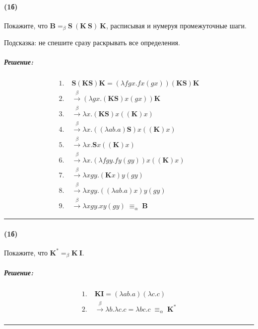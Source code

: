 \documentclass{article}
\newenvironment{proof}{\subparagraph{\hspace{-1em}Решение:\newline}}{\par\noindent\rule{\textwidth}{0.4pt}}
\newcommand{\comb}[1]{\mathbf{#1}}
\newcommand{\eqbeta}{=_\beta}
\begin{document}
    \paragraph{(1б)}

    Покажите, что $\comb{B} \eqbeta \comb{S}~(\comb{K}~\comb{S})~\comb{K}$, расписывая и нумеруя промежуточные шаги.

    Подсказка: не спешите сразу раскрывать все определения.

    \begin{proof}
        \[
            \begin{aligned}
                \text{1.} \;& \mathbf{S} (\mathbf{K}\mathbf{S}) \mathbf{K}
                = (\lambda f g x. f x (g x)) (\mathbf{K}\mathbf{S}) \mathbf{K} \\[1mm]
                \text{2.} \;& \xrightarrow{\beta} (\lambda g x. (\mathbf{K}\mathbf{S}) x (g x)) \mathbf{K} \\[1mm]
                \text{3.} \;& \xrightarrow{\beta} \lambda x. (\mathbf{K}\mathbf{S}) x ((\mathbf{K}) x) \\[1mm]
                \text{4.} \;& \xrightarrow{\beta} \lambda x. ((\lambda a b. a) \mathbf{S}) x ((\mathbf{K}) x) \\[1mm]
                \text{5.} \;& \xrightarrow{\beta} \lambda x. \mathbf{S} x ((\mathbf{K}) x) \\[1mm]
                \text{6.} \;& \xrightarrow{\beta} \lambda x. (\lambda f g y. f y (g y)) x ((\mathbf{K}) x) \\[1mm]
                \text{7.} \;& \xrightarrow{\beta} \lambda x g y. (\mathbf{K} x) y (g y) \\[1mm]
                \text{8.} \;& \xrightarrow{\beta} \lambda x g y. ((\lambda a b. a) x) y (g y) \\[1mm]
                \text{9.} \;& \xrightarrow{\beta} \lambda x g y. x y (g y) \;\equiv_\alpha\; \mathbf{B}
            \end{aligned}
        \]

    \end{proof}

    \paragraph{(1б)}

    Покажите, что $\comb{K}^* \eqbeta \comb{K}~\comb{I}$.

    \begin{proof}
        \[
            \begin{aligned}
                \text{1.} \;& \mathbf{K} \mathbf{I} = (\lambda a b. a) (\lambda c. c) \\[1mm]
                \text{2.} \;& \xrightarrow{\beta} \lambda b. \lambda c. c = \lambda b c. c \;\equiv_\alpha\; \mathbf{K}^* \\[1mm]
            \end{aligned}
        \]
    \end{proof}
\end{document}
